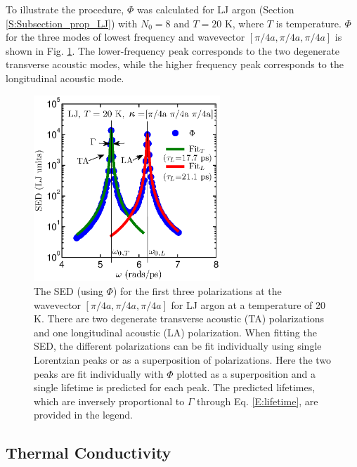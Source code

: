 \documentclass[aps,prb,preprint,superscriptaddress,amsmath,amssymb,floatfix]{revtex4}
\begin{document}
To illustrate the procedure, $\Phi$ was calculated for LJ argon (Section \ref{S:Subsection_prop_LJ}) with $N_0=8$ and $T=20$ K, where $T$ is temperature. $\Phi$ for the three modes of lowest frequency and wavevector $[\pi/4a,\pi/4a,\pi/4a]$ is shown in Fig$.$ \ref{F:LJ_FIT_PEAK}. The lower-frequency peak corresponds to the two degenerate transverse acoustic modes, while the higher frequency peak corresponds to the longitudinal acoustic mode.\cite{dove1993}

\begin{figure}
\begin{center}
\includegraphics[angle=0,width=70.0mm]{LJ_FIT_PEAK.eps}
\vspace*{-5mm}
\end{center}
\caption{\label{F:LJ_FIT_PEAK} The SED (using $\Phi$) for the first three polarizations at the wavevector $[\pi/4a,\pi/4a,\pi/4a]$ for LJ argon at a temperature of 20 K. There are two degenerate transverse acoustic (TA) polarizations and one longitudinal acoustic (LA) polarization. When fitting the SED, the different polarizations can be fit individually using single Lorentzian peaks or as a superposition of polarizations. Here the two peaks are fit individually with $\Phi$ plotted as a superposition and a single lifetime is predicted for each peak. The predicted lifetimes, which are inversely proportional to $\Gamma$ through Eq$.$ \eqref{E:lifetime}, are provided in the legend.}
\end{figure}

\vspace*{5mm}

\subsection{\label{Subsection_Comp_Details_3}Thermal Conductivity}
\end{document}
